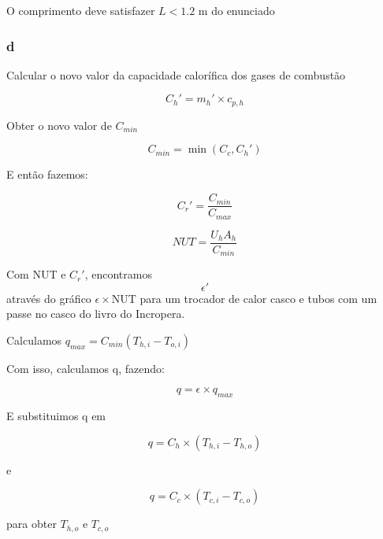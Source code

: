 \documentclass[a4paper, 12pt]{article}
\begin{document}
O comprimento deve satisfazer $L < 1.2$ m do enunciado
\subsubsection{d}

Calcular o novo valor da capacidade calorífica dos gases de combustão

\[C_{h}' = m_{h}' \times c_{p,h}\]

Obter o novo valor de $C_{min}$

\[C_{min} = \min(C_{c},C_{h}')\]

E então fazemos:

\[C_{r}' = \frac{C_{min}}{C_{max}}\]

\[NUT = \frac{U_{h}A_{h}}{C_{min}}\]

Com NUT e $C_{r}'$, encontramos \[\epsilon'\] através do gráfico $\epsilon \times$NUT para um trocador de calor casco e tubos com um passe no casco do livro do Incropera.

Calculamos $q_{max} = C_{min} (T_{h,i}-T_{o,i})$

Com isso, calculamos q, fazendo:

\[q = \epsilon \times q_{max}\]


E substituimos q em

\[q = C_{h} \times (T_{h,i} - T_{h,o})\]

e 

\[q = C_{c} \times (T_{c,i} - T_{c,o})\]

para obter $T_{h,o}$ e $T_{c,o}$


\begin{figure}[h]
\begin{center}
\end{center}
\end{figure}
\end{document}
